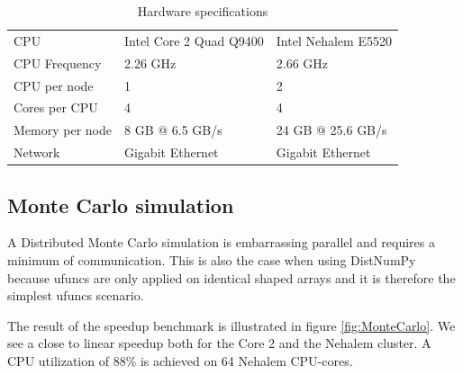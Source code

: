 \documentclass[10pt]{article}
\begin{document}

\begin{table}
\caption{Hardware specifications}
\centering
\begin{tabular}{|lll|}
\hline
CPU & Intel Core 2 Quad Q9400 & Intel Nehalem E5520\\
CPU Frequency & 2.26 GHz & 2.66 GHz\\
CPU per node & 1 & 2\\
Cores per CPU & 4 & 4\\
Memory per node & 8 GB @ 6.5 GB/s & 24 GB @ 25.6 GB/s\\
Network & Gigabit Ethernet & Gigabit Ethernet\\
\hline
\end{tabular}

\label{tab:specs}
\end{table}


\subsection{Monte Carlo simulation}
A Distributed Monte Carlo simulation is embarrassing parallel and requires a minimum of communication.  This is also the case when using DistNumPy because ufuncs are only applied on identical shaped arrays and it is therefore the simplest ufuncs scenario.

The result of the speedup benchmark is illustrated in figure \ref{fig:MonteCarlo}. We see a close to linear speedup both for the Core 2 and the Nehalem cluster. A CPU utilization of 88\% is achieved on 64 Nehalem CPU-cores.
\end{document}

